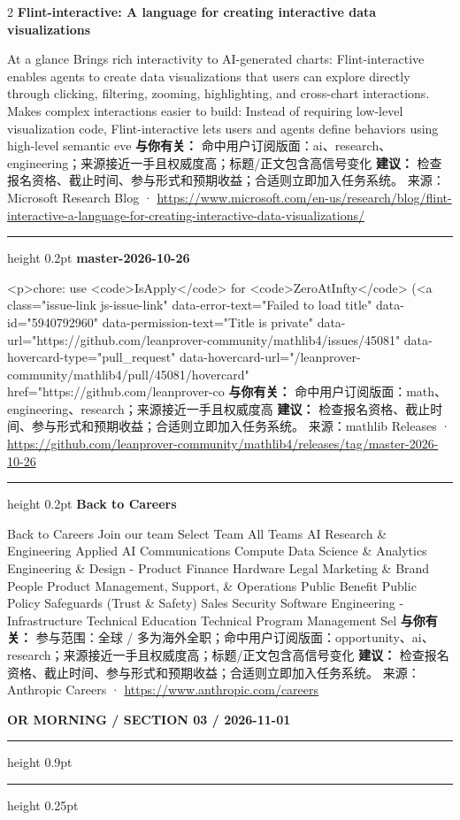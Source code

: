 \documentclass[10.5pt]{ctexart}
\begin{document}
\begin{multicols}{2}
{\large\bfseries Flint-interactive: A language for creating interactive data visualizations}\par
At a glance Brings rich interactivity to AI-generated charts: Flint-interactive enables agents to create data visualizations that users can explore directly through clicking, filtering, zooming, highlighting, and cross-chart interactions. Makes complex interactions easier to build: Instead of requiring low-level visualization code, Flint-interactive lets users and agents define behaviors using high-level semantic eve
\textbf{与你有关：} 命中用户订阅版面：ai、research、engineering；来源接近一手且权威度高；标题/正文包含高信号变化
\textbf{建议：} 检查报名资格、截止时间、参与形式和预期收益；合适则立即加入任务系统。
{\footnotesize\color{ormuted} 来源：Microsoft Research Blog · \url{https://www.microsoft.com/en-us/research/blog/flint-interactive-a-language-for-creating-interactive-data-visualizations/}}
\vspace{2mm}
\hrule height 0.2pt
\vspace{2mm}
{\large\bfseries master-2026-10-26}\par
<p>chore: use <code>IsApply</code> for <code>ZeroAtInfty</code> (<a class="issue-link js-issue-link" data-error-text="Failed to load title" data-id="5940792960" data-permission-text="Title is private" data-url="https://github.com/leanprover-community/mathlib4/issues/45081" data-hovercard-type="pull\_request" data-hovercard-url="/leanprover-community/mathlib4/pull/45081/hovercard" href="https://github.com/leanprover-co
\textbf{与你有关：} 命中用户订阅版面：math、engineering、research；来源接近一手且权威度高
\textbf{建议：} 检查报名资格、截止时间、参与形式和预期收益；合适则立即加入任务系统。
{\footnotesize\color{ormuted} 来源：mathlib Releases · \url{https://github.com/leanprover-community/mathlib4/releases/tag/master-2026-10-26}}
\vspace{2mm}
\hrule height 0.2pt
\vspace{2mm}
{\large\bfseries Back to Careers}\par
Back to Careers Join our team Select Team All Teams AI Research \& Engineering Applied AI Communications Compute Data Science \& Analytics Engineering \& Design - Product Finance Hardware Legal Marketing \& Brand People Product Management, Support, \& Operations Public Benefit Public Policy Safeguards (Trust \& Safety) Sales Security Software Engineering - Infrastructure Technical Education Technical Program Management Sel
\textbf{与你有关：} 参与范围：全球 / 多为海外全职；命中用户订阅版面：opportunity、ai、research；来源接近一手且权威度高；标题/正文包含高信号变化
\textbf{建议：} 检查报名资格、截止时间、参与形式和预期收益；合适则立即加入任务系统。
{\footnotesize\color{ormuted} 来源：Anthropic Careers · \url{https://www.anthropic.com/careers}}
\end{multicols}
\newpage
{\small\bfseries OR MORNING / SECTION 03 / 2026-11-01}
\vspace{2mm}
\hrule height 0.9pt
\vspace{1.5mm}
\hrule height 0.25pt
\vspace{4mm}
\end{document}
